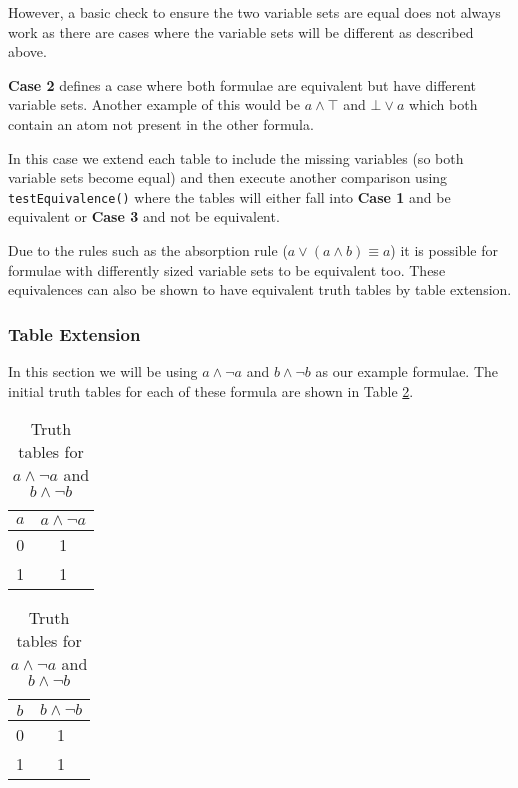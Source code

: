 \documentclass[draft]{report}
\begin{document}
However, a basic check to ensure the two variable sets are equal does not always work as there are cases where the variable sets will be different as described above. 

\textbf{Case 2} defines a case where both formulae are equivalent but have different variable sets. Another example of this would be $a\land\top$ and $\bot\lor a$ which both contain an atom not present in the other formula.

In this case we extend each table to include the missing variables (so both variable sets become equal) and then execute another comparison using {\tt testEquivalence()} where the tables will either fall into \textbf{Case 1} and be equivalent or \textbf{Case 3} and not be equivalent. 

Due to the rules such as the absorption rule ($a \lor (a \land b) \equiv a$) it is possible for formulae with differently sized variable sets to be equivalent too. These equivalences can also be shown to have equivalent truth tables by table extension.

\subsubsection{Table Extension}

In this section we will be using $a \land \lnot a$ and $b \land \lnot b$ as our example formulae. The initial truth tables for each of these formula are shown in Table \ref{table:a_and_not_a}.

\begin{table}[h]
  \begin{center}
\begin{tabular}{ | c || c | }
      \hline
      $a$ & $a \land \lnot a$ \\ \hline
      0 & 1 \\
      1 & 1 \\
      \hline
\end{tabular}
\hspace{15mm}
\begin{tabular}{ | c || c | }
      \hline
      $b$ & $b \land \lnot b$ \\ \hline
      0 & 1 \\
      1 & 1 \\
      \hline
\end{tabular}
  \end{center}
  \caption{Truth tables for $a \land \lnot a$ and $b \land \lnot b$}
  \label{table:a_and_not_a}
\end{table}
\end{document}
